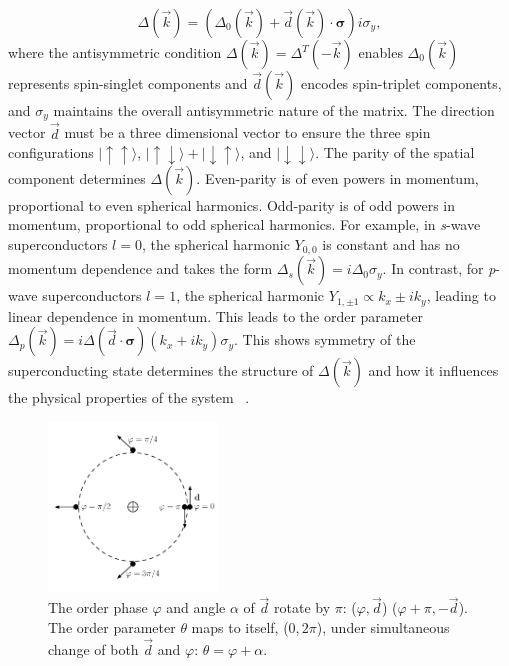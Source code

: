 \begin{equation}
  \Delta (\vec{k}) = \left(\Delta_0 (\vec{k}) + \vec{d}(\vec{k}) \cdot \bm{\sigma}\right) i \sigma_y,
\end{equation}
where the antisymmetric condition $\Delta(\vec{k}) = \Delta^T(-\vec{k})$ enables $\Delta_0 (\vec{k})$ represents spin-singlet components and $\vec{d}(\vec{k})$ encodes spin-triplet components, and $\sigma_y$ maintains the overall antisymmetric nature of the matrix.
The direction vector $\vec{d}$ must be a three dimensional vector to ensure the three spin configurations
$|\uparrow\uparrow\rangle$, $|\uparrow\downarrow\rangle + |\downarrow\uparrow\rangle$, and $|\downarrow\downarrow\rangle$.
The parity of the spatial component determines $\Delta(\vec{k})$.
Even-parity is of even powers in momentum, proportional to even spherical harmonics.
Odd-parity is of odd powers in momentum, proportional to odd spherical harmonics.
For example, in \textit{s}-wave superconductors $l=0$, the spherical harmonic $Y_{0,0}$ is constant and has no momentum dependence and takes the form
$\Delta_s (\vec{k}) = i\Delta_0 \sigma_y$.
In contrast, for \textit{p}-wave superconductors $l=1$, the spherical harmonic $Y_{1,\pm1} \propto k_x \pm i k_y$, leading to linear dependence in momentum.
This leads to the order parameter
$\Delta_p(\vec{k}) = i\Delta (\vec{d} \cdot \bm{\sigma}) (k_x+ik_y) \sigma_y$.
This shows symmetry of the superconducting state determines the structure of $\Delta(\vec{k})$ and how it influences the physical properties of the system ~\cite{ivanovNonAbelianStatisticsHalfQuantum2001}.

\begin{figure}
  \includegraphics[width=0.4\textwidth]{./figures/half-quantum-vortex.pdf}
  \caption{The order phase $\varphi$ and angle $\alpha$ of $\vec{d}$ rotate by $\pi$: ($\varphi , \vec{d}$) \rightarrow ($\varphi+\pi, -\vec{d}$). The order parameter $\theta$ maps to itself, ($0, 2\pi$), under simultaneous change of both $\vec{d}$ and $\varphi$: $\theta = \varphi + \alpha$.}
  \label{fig:half-quantum-vortex}
\end{figure}

